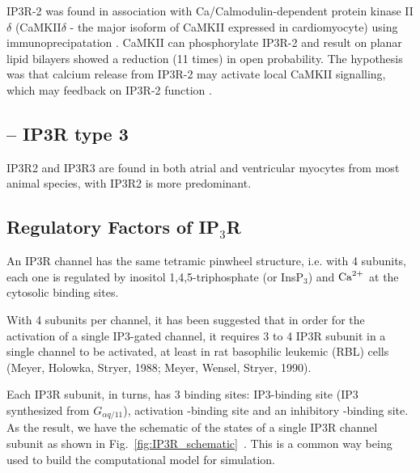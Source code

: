 IP3R-2 was found in association with Ca/Calmodulin-dependent protein kinase
II$\delta$ (CaMKII$\delta$ - the major isoform of CaMKII expressed in
cardiomyocyte) using immunoprecipatation \citep{bare2005}. CaMKII can
phosphorylate IP3R-2 and result on planar lipid bilayers showed a reduction (11
times) in open probability. The hypothesis was that calcium release from IP3R-2
may activate local CaMKII signalling, which may feedback on IP3R-2 function
\citep{bare2005}.



\subsection{-- IP3R type 3}
\label{sec:IP3R-type3}

IP3R2 and IP3R3 are found in both atrial and ventricular myocytes from most
animal species, with IP3R2 is more predominant.






\subsection{Regulatory Factors of IP$_3$R}
\label{sec:IP3R-regulatory-factors}

An IP3R channel has the same tetramic pinwheel structure, i.e. with 4 subunits,
each one is regulated by inositol 1,4,5-triphosphate (\IPthree or InsP$_3$) and
${\text{Ca}^{2+}}$ at the cytosolic binding sites.

With 4 subunits per channel, it has been suggested that in order for the
activation of a single IP3-gated channel, it requires 3 to 4 IP3R subunit in a
single channel to be activated, at least in rat basophilic leukemic (RBL) cells
(Meyer, Holowka, Stryer, 1988; Meyer, Wensel, Stryer, 1990).

Each IP3R subunit, in turns, has 3 binding sites: IP3-binding site (IP3
synthesized from $G_{\alpha q/11}$), activation -binding site and an
inhibitory -binding site. As the result, we have the schematic of the
states of a single IP3R channel subunit as shown in
Fig.~\ref{fig:IP3R_schematic}~\citep{shuai2007kms}. This is a common way being
used to build the computational model for simulation. 

